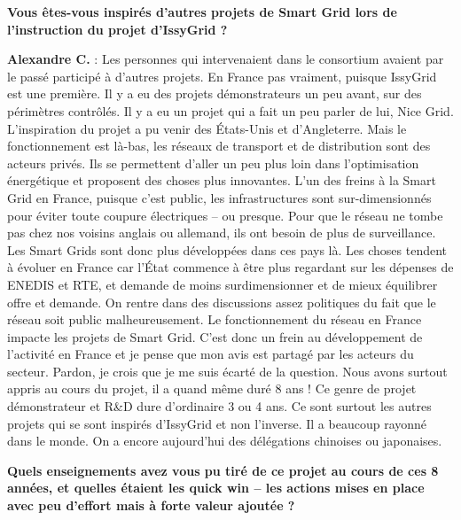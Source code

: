 \textbf{Vous êtes-vous inspirés d’autres projets de Smart Grid lors de l’instruction du projet d’IssyGrid ?}

\textbf{Alexandre C.} :
Les personnes qui intervenaient dans le consortium avaient par le passé participé à d’autres projets.
En France pas vraiment, puisque IssyGrid est une première.
Il y a eu des projets démonstrateurs un peu avant, sur des périmètres contrôlés.
Il y a eu un projet qui a fait un peu parler de lui, Nice Grid.
L’inspiration du projet a pu venir des États-Unis et d’Angleterre.
Mais le fonctionnement est là-bas, les réseaux de transport et de distribution sont des acteurs privés.
Ils se permettent d'aller un peu plus loin dans l’optimisation énergétique et proposent des choses plus innovantes.
L’un des freins à la Smart Grid en France, puisque c’est public,
les infrastructures sont sur-dimensionnés pour éviter toute coupure électriques – ou presque.
Pour que le réseau ne tombe pas chez nos voisins anglais ou allemand, ils ont besoin de plus de surveillance.
Les Smart Grids sont donc plus développées dans ces pays là.
Les choses tendent à évoluer en France car l’État commence à être plus regardant sur les dépenses de ENEDIS et RTE,
et demande de moins surdimensionner et de mieux équilibrer offre et demande.
On rentre dans des discussions assez politiques du fait que le réseau soit public malheureusement.
Le fonctionnement du réseau en France impacte les projets de Smart Grid.
C’est donc un frein au développement de l’activité en France et je pense que mon avis est partagé par les acteurs du secteur.
Pardon, je crois que je me suis écarté de la question.
Nous avons surtout appris au cours du projet, il a quand même duré 8 ans !
Ce genre de projet démonstrateur et R\&D dure d'ordinaire 3 ou 4 ans.
Ce sont surtout les autres projets qui se sont inspirés d’IssyGrid et non l’inverse.
Il a beaucoup rayonné dans le monde. On a encore aujourd’hui des délégations chinoises ou japonaises.


\textbf{Quels enseignements avez vous pu tiré de ce projet au cours de ces 8 années, et quelles étaient les quick win
– les actions mises en place avec peu d’effort mais à forte valeur ajoutée ?}

